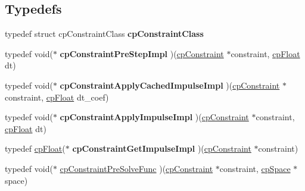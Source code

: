 \subsection*{Typedefs}
\begin{DoxyCompactItemize}
\item 
\hypertarget{group__cp_constraint_gacd079b4408f3205d9baa3e78b6b8e1b6}{typedef struct cp\-Constraint\-Class {\bfseries cp\-Constraint\-Class}}\label{group__cp_constraint_gacd079b4408f3205d9baa3e78b6b8e1b6}

\item 
\hypertarget{group__cp_constraint_gab9fdf23a539a013086b26833691ca0b3}{typedef void($\ast$ {\bfseries cp\-Constraint\-Pre\-Step\-Impl} )(\hyperlink{structcp_constraint}{cp\-Constraint} $\ast$constraint, \hyperlink{group__basic_types_gac1ed65573e035bf892505768c852d8d3}{cp\-Float} dt)}\label{group__cp_constraint_gab9fdf23a539a013086b26833691ca0b3}

\item 
\hypertarget{group__cp_constraint_ga9dd4679120c0727934965a28ee052221}{typedef void($\ast$ {\bfseries cp\-Constraint\-Apply\-Cached\-Impulse\-Impl} )(\hyperlink{structcp_constraint}{cp\-Constraint} $\ast$constraint, \hyperlink{group__basic_types_gac1ed65573e035bf892505768c852d8d3}{cp\-Float} dt\-\_\-coef)}\label{group__cp_constraint_ga9dd4679120c0727934965a28ee052221}

\item 
\hypertarget{group__cp_constraint_ga1f49b584324c77fcebef925918793d65}{typedef void($\ast$ {\bfseries cp\-Constraint\-Apply\-Impulse\-Impl} )(\hyperlink{structcp_constraint}{cp\-Constraint} $\ast$constraint, \hyperlink{group__basic_types_gac1ed65573e035bf892505768c852d8d3}{cp\-Float} dt)}\label{group__cp_constraint_ga1f49b584324c77fcebef925918793d65}

\item 
\hypertarget{group__cp_constraint_ga4f3d31551af8127f7629c71d9bd147e2}{typedef \hyperlink{group__basic_types_gac1ed65573e035bf892505768c852d8d3}{cp\-Float}($\ast$ {\bfseries cp\-Constraint\-Get\-Impulse\-Impl} )(\hyperlink{structcp_constraint}{cp\-Constraint} $\ast$constraint)}\label{group__cp_constraint_ga4f3d31551af8127f7629c71d9bd147e2}

\item 
\hypertarget{group__cp_constraint_ga31a2ad1ca9b9ecd4124a81b1292714e0}{typedef void($\ast$ \hyperlink{group__cp_constraint_ga31a2ad1ca9b9ecd4124a81b1292714e0}{cp\-Constraint\-Pre\-Solve\-Func} )(\hyperlink{structcp_constraint}{cp\-Constraint} $\ast$constraint, \hyperlink{structcp_space}{cp\-Space} $\ast$space)}\label{group__cp_constraint_ga31a2ad1ca9b9ecd4124a81b1292714e0}


\end{DoxyCompactItemize}
